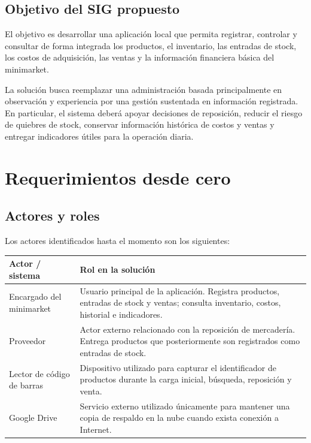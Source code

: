 \documentclass[10pt,a4paper]{article}
\begin{document}
\subsection{Objetivo del SIG propuesto}

El objetivo es desarrollar una aplicación local que permita registrar, controlar y consultar de forma integrada los productos, el inventario, las entradas de stock, los costos de adquisición, las ventas y la información financiera básica del minimarket.

La solución busca reemplazar una administración basada principalmente en observación y experiencia por una gestión sustentada en información registrada. En particular, el sistema deberá apoyar decisiones de reposición, reducir el riesgo de quiebres de stock, conservar información histórica de costos y ventas y entregar indicadores útiles para la operación diaria.

\section{Requerimientos desde cero}

\subsection{Actores y roles}

Los actores identificados hasta el momento son los siguientes:

\begin{longtable}{|p{}|p{}|}
\hline
\textbf{Actor / sistema} & \textbf{Rol en la solución} \\
\hline
Encargado del minimarket & Usuario principal de la aplicación. Registra productos, entradas de stock y ventas; consulta inventario, costos, historial e indicadores. \\
\hline
Proveedor & Actor externo relacionado con la reposición de mercadería. Entrega productos que posteriormente son registrados como entradas de stock. \\
\hline
Lector de código de barras & Dispositivo utilizado para capturar el identificador de productos durante la carga inicial, búsqueda, reposición y venta. \\
\hline
Google Drive & Servicio externo utilizado únicamente para mantener una copia de respaldo en la nube cuando exista conexión a Internet. \\
\hline
\end{longtable}
\end{document}
